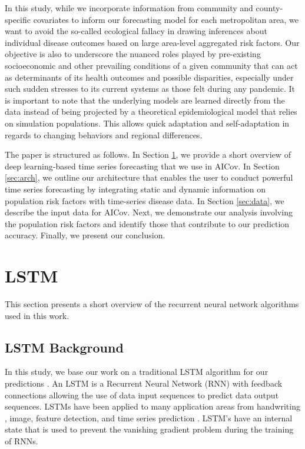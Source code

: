 \documentclass[a4paper, inpress]{jds} %
\renewcommand{\_}{%
    \textunderscore\hspace{0pt}%
}
\begin{document}
In this study, while we incorporate information from community and
county-specific covariates to inform our forecasting model for each
metropolitan area, we want to avoid the so-called ecological fallacy
in drawing inferences about individual disease outcomes based on large
area-level aggregated risk factors. Our objective is also to
underscore the nuanced roles played by pre-existing socioeconomic and
other prevailing conditions of a given community that can act as
determinants of its health outcomes and possible disparities,
especially under such sudden stresses to its current systems as those
felt during any pandemic.  It is important to note that the underlying
models are learned directly from the data instead of being projected
by a theoretical epidemiological model that relies on simulation
populations. This allows quick adaptation and self-adaptation in
regards to changing behaviors and regional differences.

The paper is structured as follows. In Section \ref{sec:lstm-theory},
we provide a short overview of deep learning-based time series
forecasting that we use in AICov. In Section \ref{sec:arch}, we
outline our architecture that enables the user to conduct powerful
time series forecasting by integrating static and dynamic information
on population risk factors with time-series disease data. In Section
\ref{sec:data}, we describe the input data for AICov. Next, we
demonstrate our analysis involving the population risk factors and
identify those that contribute to our prediction accuracy. Finally, we
present our conclusion.


\section{LSTM}
\label{sec:lstm-theory}

This section presents a short overview of the recurrent neural network
algorithms used in this work.


\subsection{LSTM Background}
\label{sec:lstm-background}

In this study, we base our work on a traditional LSTM algorithm for
our predictions \citep{www-keras-lstm,Hochreiter1997-dk}. An LSTM is a
Recurrent Neural Network (RNN) \citep{Rumelhart1986-li} with feedback
connections allowing the use of data input sequences to predict data
output sequences. LSTMs have been applied to many application areas
from handwriting \citep{Graves2009-qb}, image, feature detection, and
time series prediction \citep{Schmidhuber2005-oy}. LSTM's have an
internal state that is used to prevent the vanishing gradient problem
\citep{Hochreiter1991-mp} during the training of RNNs.
\end{document}
